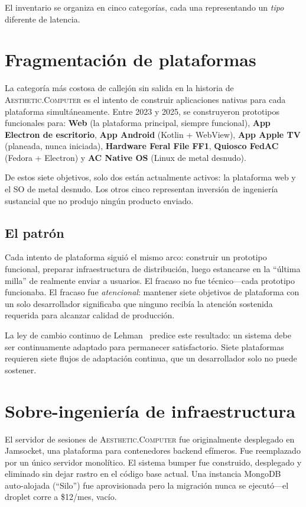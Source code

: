 \documentclass[10pt,letterpaper,twocolumn]{article}
\newcommand{\ac}{\textsc{Aesthetic.Computer}}
\begin{document}
El inventario se organiza en cinco categorías, cada una representando un \emph{tipo} diferente de latencia.

\section{Fragmentación de plataformas}
\label{sec:fragmentation}

La categoría más costosa de callejón sin salida en la historia de \ac{} es el intento de construir aplicaciones nativas para cada plataforma simultáneamente. Entre 2023 y 2025, se construyeron prototipos funcionales para: \textbf{Web} (la plataforma principal, siempre funcional), \textbf{App Electron de escritorio}, \textbf{App Android} (Kotlin + WebView), \textbf{App Apple TV} (planeada, nunca iniciada), \textbf{Hardware Feral File FF1}, \textbf{Quiosco FedAC} (Fedora + Electron) y \textbf{AC Native OS} (Linux de metal desnudo).

De estos siete objetivos, solo dos están actualmente activos: la plataforma web y el SO de metal desnudo. Los otros cinco representan inversión de ingeniería sustancial que no produjo ningún producto enviado.

\subsection{El patrón}

Cada intento de plataforma siguió el mismo arco: construir un prototipo funcional, preparar infraestructura de distribución, luego estancarse en la ``última milla'' de realmente enviar a usuarios. El fracaso no fue técnico---cada prototipo funcionaba. El fracaso fue \emph{atencional}: mantener siete objetivos de plataforma con un solo desarrollador significaba que ninguno recibía la atención sostenida requerida para alcanzar calidad de producción.

La ley de cambio continuo de Lehman~\citep{lehman1980programs} predice este resultado: un sistema debe ser continuamente adaptado para permanecer satisfactorio. Siete plataformas requieren siete flujos de adaptación continua, que un desarrollador solo no puede sostener.

\section{Sobre-ingeniería de infraestructura}

El servidor de sesiones de \ac{} fue originalmente desplegado en Jamsocket, una plataforma para contenedores backend efímeros. Fue reemplazado por un único servidor monolítico. El sistema bumper fue construido, desplegado y eliminado sin dejar rastro en el código base actual. Una instancia MongoDB auto-alojada (``Silo'') fue aprovisionada pero la migración nunca se ejecutó---el droplet corre a \$12/mes, vacío.
\end{document}
